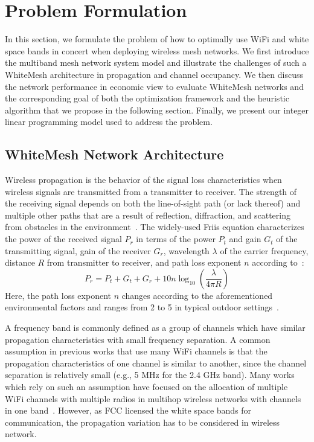 \section{Problem Formulation}
\label{sec:problemformulation}

In this section, we formulate the problem of how to optimally 
use WiFi and white space bands in concert when deploying wireless 
mesh networks.  We first introduce the multiband mesh network 
system model and illustrate the challenges of such a WhiteMesh 
architecture in propagation and channel occupancy.
We then discuss the network performance in economic view 
to evaluate WhiteMesh networks and the corresponding goal of
both the optimization framework and the heuristic algorithm that 
we propose in the following section.  Finally, we present 
our integer linear programming model used to address the problem. 
 
\subsection{WhiteMesh Network Architecture}
\label{subsec:architecture}

Wireless propagation is the behavior of the signal loss characteristics 
when wireless signals are transmitted from a transmitter to receiver.
The strength of the receiving signal depends on both the line-of-sight
path (or lack thereof) and multiple other paths that are a result of 
reflection, diffraction, and scattering from obstacles in the 
environment~\cite{andersen1995propagation}. The widely-used Friis
equation characterizes the power of the received signal $P_r$ in terms 
of the power $P_t$ and gain $G_t$ of the transmitting signal, gain of 
the receiver $G_r$, wavelength $\lambda$ of the carrier frequency, 
distance $R$ from transmitter to receiver, and path loss exponent $n$ according 
to~\cite{friis}:
\begin{equation}
\label{eq:friis}
P_r=P_t+G_t+G_r+10n \log_{10}\left( \frac{\lambda}{4\pi R}\right)
\end{equation}
Here, the path loss exponent $n$ changes according to the
aforementioned environmental factors and ranges from 2 to 5 in typical
outdoor settings~\cite{rappaport}.

A frequency band is commonly defined as a group of channels which have
similar propagation characteristics with small frequency separation.
A common assumption in previous works that use many WiFi channels 
is that the propagation characteristics of one channel is similar 
to another, since the channel separation is relatively small 
(e.g., 5 MHz for the 2.4 GHz band).
Many works which rely on such an assumption have focused on the 
allocation of multiple WiFi channels with multiple radios in 
multihop wireless networks with channels in one band~\cite{doraghinejad2014channel}.
However, as FCC licensed the white space bands for communication,
the propagation variation has to be considered in wireless network. 

